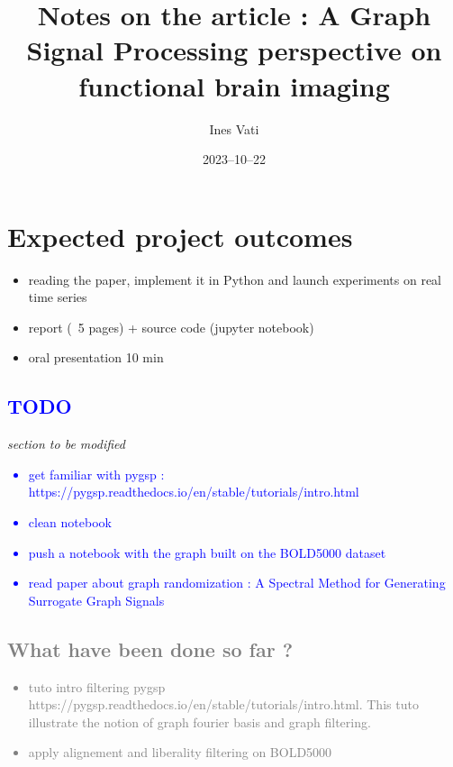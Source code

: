 \documentclass[12pt]{article}
\title{Notes on the article : A Graph Signal Processing perspective on functional brain imaging}
\author{Ines Vati}
\date{2023–10–22}
\newcommand{\blue}[1]{\textcolor{blue}{#1}}
\newcommand{\gray}[1]{\textcolor{gray}{#1}}
\begin{document}
\maketitle

\section{Expected project outcomes}
\begin{itemize}
    \item reading the paper, implement it in Python and launch experiments on real time series
    \item report (~5 pages) + source code (jupyter notebook)
    \item oral presentation 10 min
\end{itemize}

\blue{\subsection{TODO}}
\textit{section to be modified}
\blue{
    \begin{itemize}
        \item get familiar with pygsp : https://pygsp.readthedocs.io/en/stable/tutorials/intro.html
        \item clean notebook 
        \item push a notebook with the graph built on the BOLD5000 dataset
        \item read paper about graph randomization : A Spectral Method for Generating Surrogate Graph Signals 
    \end{itemize}
}

\gray{\subsection{What have been done so far ?}}
\gray{
    \begin{itemize}
        \item tuto intro filtering pygsp https://pygsp.readthedocs.io/en/stable/tutorials/intro.html. This tuto illustrate the notion of graph fourier basis and graph filtering.
        \item apply alignement and liberality filtering on BOLD5000
    \end{itemize}
}
\end{document}
